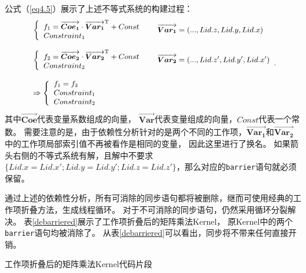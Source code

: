 公式（\ref{eq4.5}）展示了上述不等式系统的构建过程：
\begin{equation}
\small
\begin{array}{l}
\left\{ \begin{array}{l}
{f_1} = \overrightarrow {\bm{Co{e_1}}}  \cdot {\overrightarrow {\bm{Var_1}}}^{\rm T} + Const\\
Constrain{t_1}
\end{array} \right. \hspace{0.2in}{\overrightarrow {\bm{Var_1}}} = (...,Lid.z,Lid.y,Lid.x)\\
\\ 
\left\{ \begin{array}{l}
{f_2} = \overrightarrow {\bm{Co{e_2}}}  \cdot {\overrightarrow {\bm{Var_2}}}^{\rm T} + Const\\
Constrain{t_2}
\end{array} \right. \hspace{0.2in}{\overrightarrow {\bm{Var_2}}} = (...,Lid.z',Lid.y',Lid.x')\\
\\ 
\Rightarrow \left\{ \begin{array}{l}
{f_1} = {f_2}\\
Constrain{t_1}\\
Constrain{t_2}
\end{array} \right.
\end{array}.
\label{eq4.5}
\end{equation}
其中$\overrightarrow{\bm{Coe}}$代表变量系数组成的向量，
$\overrightarrow{\bm{Var}}$代表变量组成的向量，$Const$代表一个常数。
需要注意的是，由于依赖性分析针对的是两个不同的工作项，$\overrightarrow{\bm{Var_1}}$和$\overrightarrow{\bm{Var_2}}$中的工作项局部索引值不再被看作是相同的变量，
因此这里进行了换名。
如果箭头右侧的不等式系统有解，且解中不要求$\{Lid.x=Lid.x'; Lid.y=Lid.y'; Lid.z=Lid.z'\}$，那么对应的\texttt{barrier}语句就必须保留。

通过上述的依赖性分析，所有可消除的同步语句都将被删除，继而可使用经典的工作项折叠方法，生成线程循环。
对于不可消除的同步语句，仍然采用循环分裂解决。
表\ref{debarriered}展示了工作项折叠后的矩阵乘法Kernel，
原Kernel中的两个\texttt{barrier}语句均被消除了。
从表\ref{debarriered}可以看出，同步将不带来任何直接开销。

\begin{table}[htb]
	\centering
	\caption{工作项折叠后的矩阵乘法Kernel代码片段}
	\label{debarriered}
\end{table}


